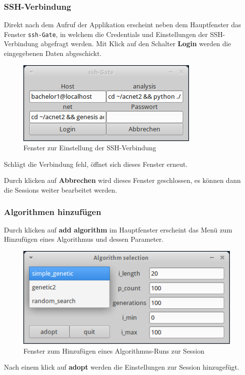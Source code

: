 \documentclass[
  a4paper,               %
  twoside,               %
  DIV=12,                %
  BCOR=8mm,              %
  headinclude=true,      %
  footinclude=false,     %
  numbers=noenddot,      %
  headheight=40pt,       %
  11pt]{scrartcl}        %
\begin{document}
\subsubsection{SSH-Verbindung}
Direkt nach dem Aufruf der Applikation erscheint neben dem Hauptfenster das Fenster \texttt{ssh-Gate}, in welchem die Credentials und Einstellungen der SSH-Verbindung abgefragt werden. Mit Klick auf den Schalter \textbf{Login} werden die eingegebenen Daten abgeschickt.
\begin{figure}[h]
\includegraphics[scale=1]{ssh-frame.png}
\caption{Fenster zur Einstellung der SSH-Verbindung}
\end{figure}

Schlägt die Verbindung fehl, öffnet sich dieses Fenster erneut.

Durch klicken auf \textbf{Abbrechen} wird dieses Fenster geschlossen, es können dann die Sessions weiter bearbeitet werden.

\subsubsection{Algorithmen hinzufügen}
Durch klicken auf \textbf{add algorithm} im Hauptfenster erscheint das Menü zum Hinzufügen eines Algorithmus und dessen Parameter.
\begin{figure}[h]
\includegraphics[scale=1]{addalg.png}
\caption{Fenster zum Hinzufügen eines Algorithmus-Runs zur Session}
\end{figure}

Nach einem klick auf \textbf{adopt} werden die Einstellungen zur Session hinzugefügt.
\end{document}
